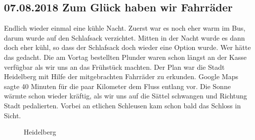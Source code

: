 \subsection{07.08.2018 Zum Glück haben wir Fahrräder}
Endlich wieder einmal eine kühle Nacht.
Zuerst war es noch eher warm im Bus, darum wurde auf den Schlafsack verzichtet.
Mitten in der Nacht wurde es dann doch eher kühl, so dass der Schlafsack doch wieder eine Option wurde.
Wer hätte das gedacht.
Die am Vortag bestellten Plunder waren schon längst an der Kasse verfügbar als wir uns an das Frühstück machten.
Der Plan war die Stadt Heidelberg mit Hilfe der mitgebrachten Fahrräder zu erkunden. 
Google Maps sagte 40 Minuten für die paar Kilometer dem Fluss entlang vor.
Die Sonne wärmte schon wieder kräftig, als wir uns auf die Sättel schwangen und Richtung Stadt pedalierten.
Vorbei an etlichen Schleusen kam schon bald das Schloss in Sicht. 

\begin{figure}[H]
   \centering
   \quad
   \quad
   \quad
   \caption[Heidelberg]{Heidelberg}
\end{figure}

